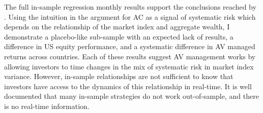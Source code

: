The full in-sample regression monthly results support the conclusions reached by \citet{pollet_average_2010}. Using the intuition in the argument for AC as a signal of systematic risk which depends on the relationship of the market index and aggregate wealth, I demonstrate a placebo-like sub-sample with an expected lack of results, a difference in US equity performance, and a systematic difference in AV managed returns across countries. Each of these results suggest AV management works by allowing investors to time changes in the mix of systematic risk in market index variance. However, in-sample relationships are not sufficient to know that investors have access to the dynamics of this relationship in real-time. It is well documented that many in-sample strategies do not work out-of-sample, and there is no real-time information.